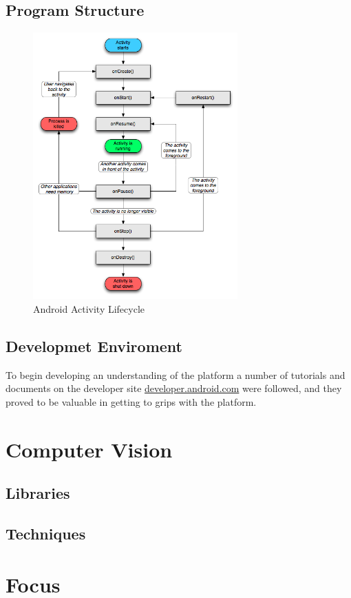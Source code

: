 \subsection{Program Structure}


\begin{figure}[h!]
\centering
    \includegraphics[width=0.7\textwidth]{research/images/activity_lifecycle.png}
    \caption{Android Activity Lifecycle}%
    \label{activity_lifecycle}
\end{figure}

\subsection{Developmet Enviroment}


To begin developing an understanding of the platform a number of tutorials and documents on the developer site \url{developer.android.com} were followed, and they proved to be valuable in getting to grips with the platform. 

\section{Computer Vision}

\subsection{Libraries}

\subsection{Techniques}

\section{Focus}
